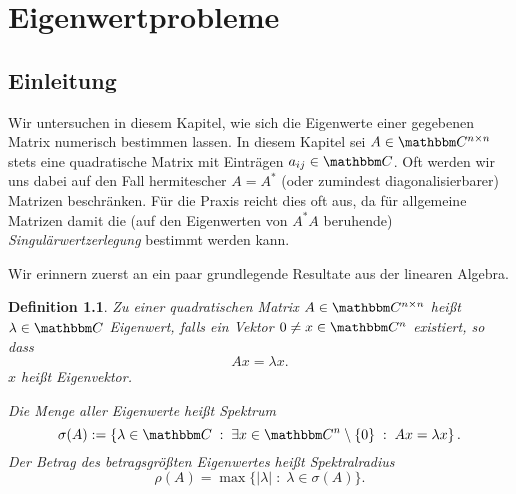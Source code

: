 \documentclass[12pt,a4paper]{book}
\theoremstyle{break}
\newtheorem{definition}[theorem]{Definition}
\theoremstyle{nonumberplain}
\newcommand{\C}{\mathbbm C}
\newcommand{\1}{\mathbbm{1}} 			      	%
\newcommand{\dd}{\; : \;}    			      	%
\begin{document}

\chapter{Eigenwertprobleme}

\section{Einleitung}

Wir untersuchen in diesem Kapitel, wie sich die Eigenwerte einer gegebenen Matrix numerisch bestimmen lassen.
In diesem Kapitel sei $A\in \C^{n\times n}$ stets eine quadratische Matrix mit Einträgen $a_{ij}\in \C$.
Oft werden wir uns dabei auf den Fall hermitescher $A=A^*$ (oder zumindest diagonalisierbarer) Matrizen beschränken. 
Für die Praxis reicht dies oft aus, da für allgemeine Matrizen damit die (auf den Eigenwerten von $A^*A$ beruhende)
\emph{Singulärwertzerlegung} bestimmt werden kann.

Wir erinnern zuerst an ein paar grundlegende Resultate aus der linearen Algebra.

\begin{definition}
Zu einer quadratischen Matrix $A\in \C^{n\times n}$ heißt $\lambda\in \C$ \emph{Eigenwert}, falls ein Vektor
$0\neq x\in \C^n$ existiert, so dass
\[
Ax=\lambda x.
\]
$x$ heißt \emph{Eigenvektor}. 

Die Menge aller Eigenwerte heißt \emph{Spektrum}
\[
\sigma(A):=\left\{ \lambda\in \C \dd \exists x\in \C^n\setminus\{0\} \dd Ax=\lambda x \right\}.
\]
Der Betrag des betragsgrößten Eigenwertes heißt \emph{Spektralradius}
\[
\rho(A)=\max\{|\lambda|\dd \lambda\in \sigma(A)\}.
\]
\end{definition}
\end{document}

